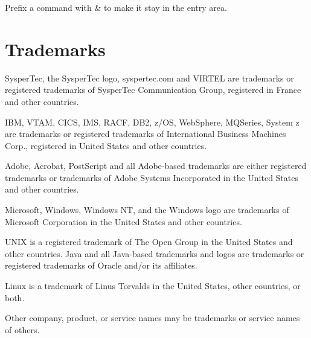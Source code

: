 \documentclass[letterpaper,10pt,english]{sphinxmanual}
\begin{document}

\begin{sphinxVerbatim}[commandchars=\\\{\}]
                         
                         
\end{sphinxVerbatim}


Prefix a command with \& to make it stay in the entry area.


\begin{sphinxVerbatim}[commandchars=\\\{\}]
                         
                        
                          
                          
                           
\end{sphinxVerbatim}


\section{Trademarks}
\label{\detokenize{Installation_Guide:trademarks}}
SysperTec, the SysperTec logo, syspertec.com and VIRTEL are trademarks or registered trademarks of SysperTec
Communication Group, registered in France and other countries.

IBM, VTAM, CICS, IMS, RACF, DB2, z/OS, WebSphere, MQSeries, System z are trademarks or registered trademarks of
International Business Machines Corp., registered in United States and other countries.

Adobe, Acrobat, PostScript and all Adobe-based trademarks are either registered trademarks or trademarks of Adobe
Systems Incorporated in the United States and other countries.

Microsoft, Windows, Windows NT, and the Windows logo are trademarks of Microsoft Corporation in the United States
and other countries.

UNIX is a registered trademark of The Open Group in the United States and other countries.
Java and all Java-based trademarks and logos are trademarks or registered trademarks of Oracle and/or its affiliates.

Linux is a trademark of Linus Torvalds in the United States, other countries, or both.

Other company, product, or service names may be trademarks or service names of others.



\renewcommand{\indexname}{Index}
\printindex
\end{document}
